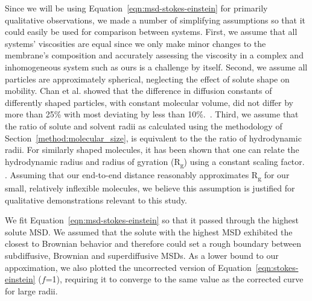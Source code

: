 \documentclass[journal=jpcbfk,manuscript=article]{achemso}
\begin{document}
  Since we will be using Equation~\ref{eqn:msd-stokes-einstein} for primarily qualitative observations, 
  we made a number of simplifying assumptions so that it could easily be used for 
  comparison between systems. First, we assume that all systems' viscosities
  are equal since we only make minor changes to the membrane's composition and
  accurately assessing the viscosity in a complex and inhomogeneous system such 
  as ours is a challenge by itself. Second, we assume all particles are approximately
  spherical, neglecting the effect of solute shape on mobility. Chan et al. 
  showed that the difference in diffusion constants of differently shaped 
  particles, with constant molecular volume, did not differ by more than 25\%
  with most deviating by less than 10\%.~\cite{chan_effects_2015}. 
  Third, we assume that the ratio of solute and solvent radii as calculated using the
  methodology of Section~\ref{method:molecular_size}, is equivalent to the the 
  ratio of hydrodynamic radii. For similarly shaped molecules, it has been shown that
  one can relate the hydrodynamic radius and radius of gyration (R\textsubscript{g})
  using a constant scaling factor. \cite{lee_molecular_2008,he_novel_2003,li_critical_2009}.
  Assuming that our end-to-end distance reasonably approximates R\textsubscript{g} 
  for our small, relatively inflexible molecules, we believe this assumption is 
  justified for qualitative demonstrations relevant to this study. 
  
  We fit Equation~\ref{eqn:msd-stokes-einstein} so that it passed through the
  highest solute MSD. We assumed that the solute with the highest MSD exhibited
  the closest to Brownian behavior and therefore could set a rough boundary
  between subdiffusive, Brownian and superdiffusive MSDs. As a lower bound to our
  appoximation, we also plotted the uncorrected version of
  Equation~\ref{eqn:stokes-einstein} ($f$=1), requiring it to converge to the
  same value as the corrected curve for large radii. 

  
\end{document}
